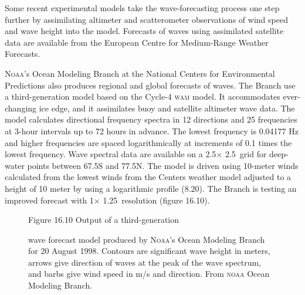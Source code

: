 Some recent experimental models take the wave-forecasting process one
step further by assimilating altimeter and
scatterometer
observations of wind speed and wave height into the model. Forecasts
of waves using assimilated satellite data are available from the
European Centre for Medium-Range Weather Forecasts.

\textsc{Noaa}'s Ocean Modeling Branch at the National Centers for
Environmental Predictions also produces regional and global forecasts
of waves. The Branch use a third-generation model based on the Cycle-4
\textsc{wam} model. It accommodates ever-changing ice edge, and it
assimilates buoy and satellite altimeter wave data. The model
calculates directional frequency spectra in 12 directions and 25
frequencies at 3-hour intervals up to 72 hours in advance. The lowest
frequency is 0.04177 Hz and higher frequencies are spaced
logarithmically at increments of 0.1 times the lowest frequency. Wave
spectral data are available on a 2.5\degrees $\times$
2.5\degrees\ grid for deep-water points between 67.5\degrees S and
77.5\degrees N.  The model is driven using 10-meter winds calculated
from the lowest winds from the Centers weather model adjusted to a
height of 10 meter by using a logarithmic profile (8.20). The Branch
is testing an improved forecast with 1\degrees $\times$
1.25\degrees\ resolution (figure 16.10).

\begin{figure} [t!]
\footnotesize
Figure 16.10 Output of a third-generation \rule{0pt}{4ex}wave forecast
model produced by \textsc{Noaa}'s Ocean Modeling Branch for 20 August
1998. Contours are significant wave height in meters, arrows give
direction of waves at the peak of the wave spectrum, and barbs give
wind speed in m/s and direction. From \textsc{noaa} Ocean Modeling
Branch.
\label{fig:noaa.waves}
\vspace{-4ex}
\end{figure}

